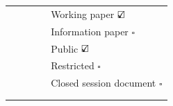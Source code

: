 \documentclass[english,11pt,a4paper,final,twoside,titlepage,pdftex]{article}
\title{\ReportTitle}
\author{\ReportAuthor}
\newcommand\CheckBoxTick{$\text{\rlap{$\checkmark$}}\square$}
\newcommand\CheckBoxUntick{$\square$}
\begin{document}
  \sloppy %
  \raggedright %


  \begin{center}
    \thispagestyle{firststyle}
    \vspace*{2cm}
    \large{\textbf{\ReportMeeting}}

    \vspace*{0.25cm}
    \large{\emph{\ReportLocation}}
		
    \vspace*{1cm}
    \large{\textbf{\ReportNumber}} \\
    \vspace*{0.5cm}	
    \huge{\ReportTitle} \\
    \vspace*{0.5cm}	
    \large{\ReportAuthor}
  \end{center}

  \begin{table}[H]
    \centering
    \begin{tabular}{|p{0.25\linewidth}|p{0.75\linewidth}|}
      \hline
      \textbf{\color{blue}{Document type}} & Working paper                            \CheckBoxTick   \\
                                           & Information paper                        \CheckBoxUntick \\
      \hline
      \textbf{\color{blue}{Distribution}}  & Public                                   \CheckBoxTick   \\
                                           & Restricted \footnotemark[1]              \CheckBoxUntick \\
                                           & Closed session document \footnotemark[2] \CheckBoxUntick \\
      \hline
      \multicolumn{2}{|l|}{\textbf{\color{blue}{Abstract}}} \\
      \hline
      \multicolumn{2}{|p{1.0\linewidth}|}{} \\
      \hline
    \end{tabular}%
  \end{table}
\end{document}
